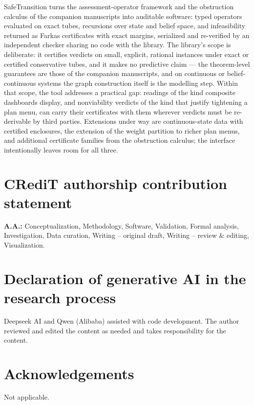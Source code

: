 \documentclass[3p,11pt]{elsarticle}
\begin{document}
SafeTransition turns the assessment-operator framework and the obstruction
calculus of the companion manuscripts into auditable software: typed
operators evaluated on exact tubes, recursions over state and belief space,
and infeasibility returned as Farkas certificates with exact margins,
serialized and re-verified by an independent checker sharing no code with
the library. The library's scope is deliberate: it certifies verdicts on
small, explicit, rational instances under exact or certified conservative
tubes, and it makes no predictive claim --- the theorem-level guarantees
are those of the companion manuscripts, and on continuous or
belief-continuous systems the graph construction itself is the modelling
step. Within that scope, the tool addresses a practical gap: readings of
the kind composite dashboards display, and nonviability verdicts of the
kind that justify tightening a plan menu, can carry their certificates with
them wherever verdicts must be re-derivable by third parties. Extensions
under way are continuous-state data with certified enclosures, the
extension of the weight partition to richer plan menus, and additional
certificate families from the obstruction calculus; the interface
intentionally leaves room for all three.

\section*{CRediT authorship contribution statement}
\textbf{A.A.:} Conceptualization, Methodology, Software, Validation,
Formal analysis, Investigation, Data curation, Writing -- original draft,
Writing -- review \& editing, Visualization.

\section*{Declaration of generative AI in the research process}
Deepseek AI and Qwen (Alibaba) assisted with code development. The author
reviewed and edited the content as needed and takes responsibility for the
content.

\section*{Acknowledgements}
Not applicable.
\end{document}
